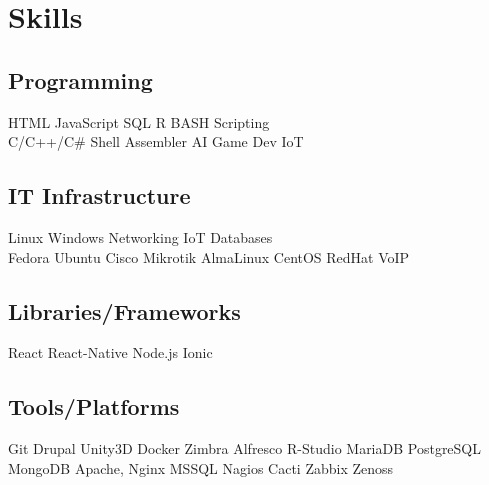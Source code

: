\documentclass[]{plushcv}
\begin{document}
\hfill
\begin{minipage}[t]{0.25\textwidth} 


\section{Skills}
\subsection{Programming}
\sectionsep
{}
HTML \textbullet{} JavaScript \textbullet{} SQL \textbullet{} R \textbullet{} BASH Scripting \\
\sectionsep
{}
C/C++/C\# \textbullet{} Shell \textbullet{}  Assembler \textbullet{} AI \textbullet{} Game Dev \textbullet{} IoT \\
\sectionsep

\subsection{IT Infrastructure}
Linux \textbullet{} Windows \textbullet{} Networking \textbullet{} IoT \textbullet{} Databases \\
\sectionsep
{}
Fedora \textbullet{} Ubuntu \textbullet{} Cisco \textbullet{} Mikrotik \textbullet{} AlmaLinux \textbullet{} CentOS \textbullet{} RedHat \textbullet{} VoIP \\
\sectionsep


\subsection{Libraries/Frameworks}
\sectionsep
React \textbullet{} React-Native \textbullet{} Node.js \textbullet{} Ionic \\
\sectionsep
\sectionsep
\subsection{Tools/Platforms}
\sectionsep
Git \textbullet{} Drupal \textbullet{} Unity3D \textbullet{} Docker \textbullet{} Zimbra \textbullet{} Alfresco \textbullet{} R-Studio \textbullet{} MariaDB \textbullet{} PostgreSQL \textbullet{} MongoDB \textbullet{} Apache, Nginx \textbullet{} MSSQL \textbullet{} Nagios \textbullet{} Cacti \textbullet{} Zabbix \textbullet{} Zenoss \\


\end{minipage}
\end{document}
